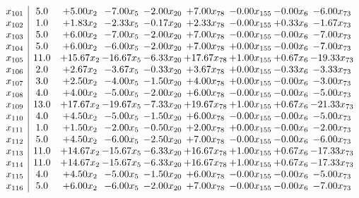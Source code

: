 \documentclass[8pt]{article}
\begin{document}
\[\begin{array}{c| c c@{\hskip 2pt} c@{\hskip 2pt} c@{\hskip 2pt} c@{\hskip 2pt} c@{\hskip 2pt} c@{\hskip 2pt} c@{\hskip 2pt} }
 x_{101}   &  5.0 & +  5.00 x_{2} & -7.00 x_{5} & -2.00 x_{20} & +  7.00 x_{78} & -0.00 x_{155} & -0.00 x_{6} & -6.00 x_{73}\\
 x_{102}   &  1.0 & +  1.83 x_{2} & -2.33 x_{5} & -0.17 x_{20} & +  2.33 x_{78} & -0.00 x_{155} & +  0.33 x_{6} & -1.67 x_{73}\\
 x_{103}   &  5.0 & +  6.00 x_{2} & -7.00 x_{5} & -2.00 x_{20} & +  7.00 x_{78} & -0.00 x_{155} & -0.00 x_{6} & -7.00 x_{73}\\
 x_{104}   &  5.0 & +  6.00 x_{2} & -6.00 x_{5} & -2.00 x_{20} & +  7.00 x_{78} & +  0.00 x_{155} & -0.00 x_{6} & -7.00 x_{73}\\
 x_{105}   &  11.0 & + 15.67 x_{2} & -16.67 x_{5} & -6.33 x_{20} & + 17.67 x_{78} & +  1.00 x_{155} & +  0.67 x_{6} & -19.33 x_{73}\\
 x_{106}   &  2.0 & +  2.67 x_{2} & -3.67 x_{5} & -0.33 x_{20} & +  3.67 x_{78} & +  0.00 x_{155} & -0.33 x_{6} & -3.33 x_{73}\\
 x_{107}   &  3.0 & +  2.50 x_{2} & -4.00 x_{5} & -1.50 x_{20} & +  4.00 x_{78} & +  0.00 x_{155} & -0.00 x_{6} & -3.00 x_{73}\\
 x_{108}   &  4.0 & +  4.00 x_{2} & -5.00 x_{5} & -2.00 x_{20} & +  6.00 x_{78} & -0.00 x_{155} & -0.00 x_{6} & -5.00 x_{73}\\
 x_{109}   &  13.0 & + 17.67 x_{2} & -19.67 x_{5} & -7.33 x_{20} & + 19.67 x_{78} & +  1.00 x_{155} & +  0.67 x_{6} & -21.33 x_{73}\\
 x_{110}   &  4.0 & +  4.50 x_{2} & -5.00 x_{5} & -1.50 x_{20} & +  6.00 x_{78} & -0.00 x_{155} & -0.00 x_{6} & -5.00 x_{73}\\
 x_{111}   &  1.0 & +  1.50 x_{2} & -2.00 x_{5} & -0.50 x_{20} & +  2.00 x_{78} & +  0.00 x_{155} & -0.00 x_{6} & -2.00 x_{73}\\
 x_{112}   &  5.0 & +  4.50 x_{2} & -6.00 x_{5} & -2.50 x_{20} & +  7.00 x_{78} & -0.00 x_{155} & -0.00 x_{6} & -6.00 x_{73}\\
 x_{113}   &  11.0 & + 14.67 x_{2} & -15.67 x_{5} & -6.33 x_{20} & + 16.67 x_{78} & +  1.00 x_{155} & +  0.67 x_{6} & -17.33 x_{73}\\
 x_{114}   &  11.0 & + 14.67 x_{2} & -15.67 x_{5} & -6.33 x_{20} & + 16.67 x_{78} & +  1.00 x_{155} & +  0.67 x_{6} & -17.33 x_{73}\\
 x_{115}   &  4.0 & +  4.50 x_{2} & -5.00 x_{5} & -1.50 x_{20} & +  6.00 x_{78} & -0.00 x_{155} & -0.00 x_{6} & -5.00 x_{73}\\
 x_{116}   &  5.0 & +  6.00 x_{2} & -6.00 x_{5} & -2.00 x_{20} & +  7.00 x_{78} & -0.00 x_{155} & -0.00 x_{6} & -7.00 x_{73}\\

\end{array}\]
\end{document}
